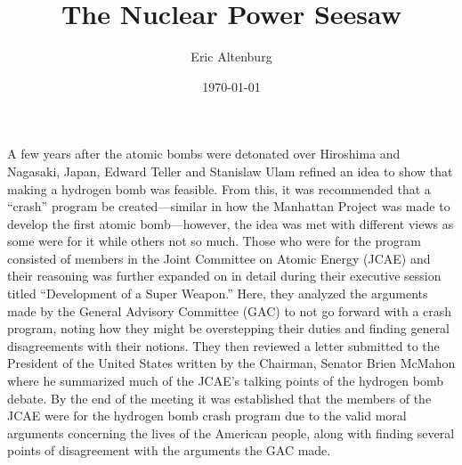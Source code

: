 \documentclass[12pt]{turabian-researchpaper}
\title{The Nuclear Power Seesaw}
\author{Eric Altenburg}
\date{\today}
\begin{document}
\maketitle

A few years after the atomic bombs were detonated over Hiroshima and Nagasaki, Japan, Edward Teller and Stanislaw Ulam refined an idea to show that making a hydrogen bomb was feasible. From this, it was recommended that a “crash” program be created—similar in how the Manhattan Project was made to develop the first atomic bomb—however, the idea was met with different views as some were for it while others not so much. Those who were for the program consisted of members in the Joint Committee on Atomic Energy (JCAE) and their reasoning was further expanded on in detail during their executive session titled “Development of a Super Weapon.” Here, they analyzed the arguments made by the General Advisory Committee (GAC) to not go forward with a crash program, noting how they might be overstepping their duties and finding general disagreements with their notions. They then reviewed a letter submitted to the President of the United States written by the Chairman, Senator Brien McMahon where he summarized much of the JCAE’s talking points of the hydrogen bomb debate. By the end of the meeting it was established that the members of the JCAE were for the hydrogen bomb crash program due to the valid moral arguments concerning the lives of the American people, along with finding several points of disagreement with the arguments the GAC made.
	
\end{document}
